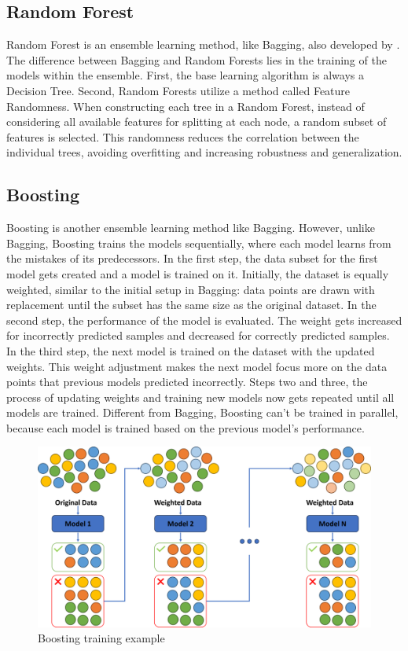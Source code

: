 \subsection{Random Forest}
Random Forest is an ensemble learning method, like Bagging, also developed
by \citet{breiman2001random}. The difference between Bagging and Random Forests
lies in the training of the models within the ensemble. 
First, the base learning algorithm is always a Decision Tree. 
Second, Random Forests utilize a method called Feature Randomness. When 
constructing each tree in a Random Forest, instead of considering all available
features for splitting at each node, a random subset of features is selected.
This randomness reduces the correlation between the individual trees, avoiding
overfitting and increasing robustness and generalization.



\subsection{Boosting}
Boosting \citep{Schapire1990} is another ensemble learning method like Bagging.
However, unlike Bagging, Boosting trains the models sequentially, where each
model learns from the mistakes of its predecessors.
In the first step, the data subset for the first model gets created and a model 
is trained on it. Initially, the dataset is equally weighted, similar to the initial
setup in Bagging: data points are drawn with replacement until the subset has the 
same size as the original dataset.
In the second step, the performance of the model is evaluated. The weight gets
increased for incorrectly predicted samples and decreased for correctly predicted
samples. 
In the third step, the next model is trained on the dataset with the updated weights.
This weight adjustment makes the next model focus more on the data points that 
previous models predicted incorrectly.
Steps two and three, the process of updating weights and training new models now gets 
repeated until all models are trained.
Different from Bagging, Boosting can't be trained in parallel, because each model
is trained based on the previous model's performance. 

\begin{figure}[htbp]
    \centering
    \includegraphics[width=.5\textwidth]{figures/boosting_training}
    \caption{Boosting training example}
\end{figure}

